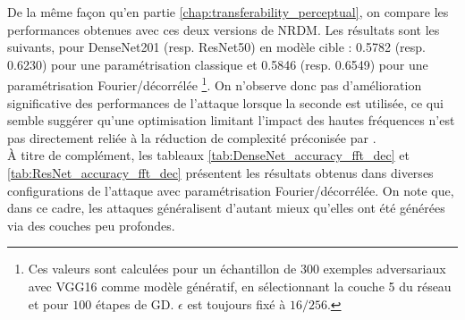 \documentclass{article}
\begin{document}

\noindent De la même façon qu'en partie \ref{chap:transferability_perceptual}, on compare les performances obtenues avec ces deux versions de NRDM. Les résultats sont les suivants, pour DenseNet201 (resp. ResNet50) en modèle cible : 0.5782 (resp. 0.6230) pour une paramétrisation classique et 0.5846 (resp. 0.6549) pour une paramétrisation Fourier/décorrélée \footnote{Ces valeurs sont calculées pour un échantillon de $300$ exemples adversariaux avec VGG16 comme modèle génératif, en sélectionnant la couche 5 du réseau et pour $100$ étapes de GD. $\epsilon$ est toujours fixé à $16/256$.}. On n'observe donc pas d'amélioration significative des performances de l'attaque lorsque la seconde est utilisée, ce qui semble suggérer qu'une optimisation limitant l'impact des hautes fréquences n'est pas directement reliée à la réduction de complexité préconisée par \citet{Demontis2018WhyDA}.\\
À titre de complément, les tableaux \ref{tab:DenseNet_accuracy_fft_dec} et \ref{tab:ResNet_accuracy_fft_dec} présentent les résultats obtenus dans diverses configurations de l'attaque avec paramétrisation Fourier/décorrélée. On note que, dans ce cadre, les attaques généralisent d'autant mieux qu'elles ont été générées via des couches peu profondes.
\end{document}
